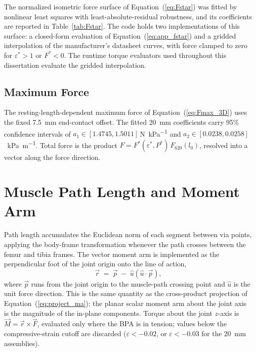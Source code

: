 The normalized isometric force surface of Equation~(\ref{eq:Fstar}) was fitted
by nonlinear least squares with least-absolute-residual robustness, and its
coefficients are reported in Table~\ref{tab:Fstar}. The code holds two
implementations of this surface: a closed-form evaluation of
Equation~(\ref{eq:app_fstar}) and a gridded interpolation of the manufacturer's
datasheet curves, with force clamped to zero for $\varepsilon^{*}>1$ or
$F^{*}<0$. The runtime torque evaluators used throughout this dissertation
evaluate the gridded interpolation.

\subsection{Maximum Force}

The resting-length-dependent maximum force of Equation~(\ref{eq:Fmax_3D}) uses
the fixed \qty{7.5}{\mm} end-contact offset. The fitted \qty{20}{\mm}
coefficients carry 95\% confidence intervals of
$a_1 \in [1.4745, 1.5011]$\,\si{\N\per\kPa} and
$a_2 \in [0.0238, 0.0258]$\,\si{\per\kPa\per\metre}. Total force is the product
$F = F^{*}(\varepsilon^{*},P^{*})\,F_{620}(l_{0})$, resolved into a vector along
the force direction.

\section{Muscle Path Length and Moment Arm}

Path length accumulates the Euclidean norm of each segment between via points,
applying the body-frame transformation whenever the path crosses between the
femur and tibia frames. The vector moment arm is implemented as the
perpendicular foot of the joint origin onto the line of action,
\begin{equation}
    \vec{r} \;=\; \vec{p} \;-\; \hat{u}\left(\hat{u}\cdot\vec{p}\right),
    \label{eq:app_perpfoot}
\end{equation}
where $\vec{p}$ runs from the joint origin to the muscle-path crossing point and
$\hat{u}$ is the unit force direction. This is the same quantity as the
cross-product projection of Equation~(\ref{eq:project_ma}); the planar scalar
moment arm about the joint axis is the magnitude of the in-plane components.
Torque about the joint $z$-axis is $\vec{M} = \vec{r}\times\vec{F}$, evaluated
only where the BPA is in tension; values below the compressive-strain cutoff
are discarded ($\varepsilon < -0.02$, or $\varepsilon < -0.03$ for the
\qty{20}{\mm} assemblies).

